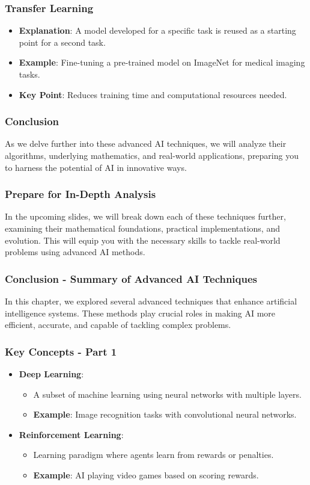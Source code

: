 \documentclass[aspectratio=169]{beamer}
\begin{document}
\begin{frame}[fragile]
    \frametitle{Transfer Learning}
    \begin{itemize}
        \item \textbf{Explanation}: A model developed for a specific task is reused as a starting point for a second task.
        \item \textbf{Example}: Fine-tuning a pre-trained model on ImageNet for medical imaging tasks.
        \item \textbf{Key Point}: Reduces training time and computational resources needed.
    \end{itemize}
\end{frame}

\begin{frame}[fragile]
    \frametitle{Conclusion}
    As we delve further into these advanced AI techniques, we will analyze their algorithms, underlying mathematics, and real-world applications, preparing you to harness the potential of AI in innovative ways.
\end{frame}

\begin{frame}[fragile]
    \frametitle{Prepare for In-Depth Analysis}
    In the upcoming slides, we will break down each of these techniques further, examining their mathematical foundations, practical implementations, and evolution. This will equip you with the necessary skills to tackle real-world problems using advanced AI methods.
\end{frame}

\begin{frame}[fragile]
    \frametitle{Conclusion - Summary of Advanced AI Techniques}
    In this chapter, we explored several advanced techniques that enhance artificial intelligence systems. 
    These methods play crucial roles in making AI more efficient, accurate, and capable of tackling complex problems.
\end{frame}

\begin{frame}[fragile]
    \frametitle{Key Concepts - Part 1}
    \begin{itemize}
        \item \textbf{Deep Learning}: 
        \begin{itemize}
            \item A subset of machine learning using neural networks with multiple layers.
            \item \textbf{Example}: Image recognition tasks with convolutional neural networks.
        \end{itemize}
        
        \item \textbf{Reinforcement Learning}:
        \begin{itemize}
            \item Learning paradigm where agents learn from rewards or penalties.
            \item \textbf{Example}: AI playing video games based on scoring rewards.
        \end{itemize}
    \end{itemize}
\end{frame}
\end{document}
